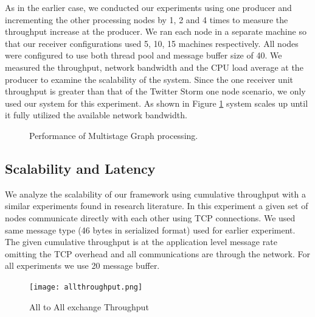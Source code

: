 As in the earlier case, we conducted our experiments using one producer and incrementing the other processing nodes by 1, 2 and 4 times to measure the throughput increase at the producer. We ran each node in a separate machine so that our receiver configurations used 5, 10, 15 machines respectively. All nodes were configured to use both thread pool and message buffer size of 40. We measured the throughput, network bandwidth and the CPU load average at the producer to examine the scalability of the system. Since the one receiver unit throughput is greater than that of the Twitter Storm \cite{toshniwal2014storm} one node scenario, we only used our system for this experiment. As shown in Figure \ref{scalability} system scales up until it fully utilized the available network bandwidth.
 
\begin{figure}[!t]
        \centering
        \hfil
        \hfil
        \hfil
        \caption{Performance of Multistage Graph processing.}
        \label{scalability}
\end{figure}

\subsection{Scalability and Latency}
We analyze the scalability of our framework using cumulative throughput with a similar experiments found in research literature.  In this experiment a given set of nodes communicate directly with each other using TCP connections.  We used same message type (46 bytes in serialized format) used for earlier experiment. The given cumulative throughput is at the application level message rate omitting the TCP overhead and all communications are through the network. For all experiments we use 20 message buffer. 

\begin{figure}[!t]
        \centering
        \texttt{[image: allthroughput.png]}
        \caption{All to All exchange Throughput}
        \label{allthroughput}
\end{figure}

